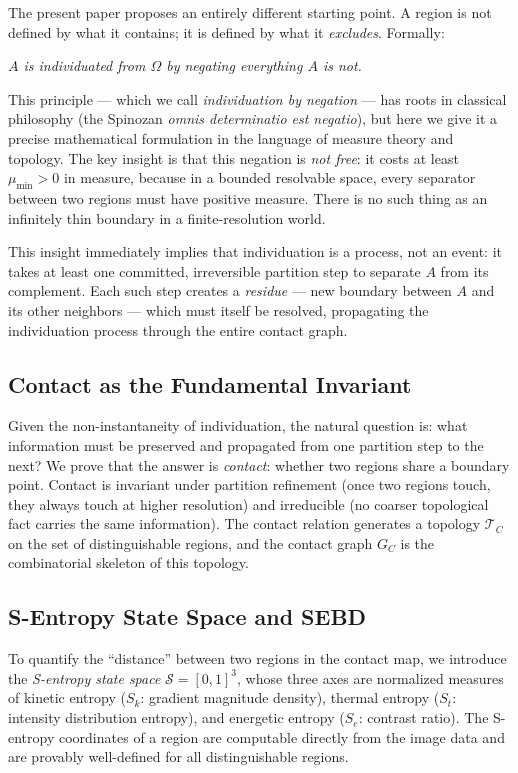 \documentclass[twocolumn]{article}
\theoremstyle{plain}
\theoremstyle{definition}
\newcommand{\TC}{\mathcal{T}_C}
\newcommand{\GC}{G_C}
\newcommand{\ScS}{\mathcal{S}}
\newcommand{\Sk}{S_k}
\newcommand{\St}{S_t}
\newcommand{\Se}{S_e}
\newcommand{\mumin}{\mu_{\min}}
\begin{document}
The present paper proposes an entirely different starting point. A region is not
defined by what it contains; it is defined by what it \emph{excludes}. Formally:

\begin{center}
\emph{$A$ is individuated from $\Omega$ by negating everything $A$ is not.}
\end{center}

This principle --- which we call \emph{individuation by negation} --- has roots
in classical philosophy (the Spinozan \emph{omnis determinatio est negatio}),
but here we give it a precise mathematical formulation in the language of measure
theory and topology. The key insight is that this negation is \emph{not free}: it
costs at least $\mumin > 0$ in measure, because in a bounded resolvable space,
every separator between two regions must have positive measure. There is no
such thing as an infinitely thin boundary in a finite-resolution world.

This insight immediately implies that individuation is a process, not an event:
it takes at least one committed, irreversible partition step to separate $A$ from
its complement. Each such step creates a \emph{residue} --- new boundary between
$A$ and its other neighbors --- which must itself be resolved, propagating the
individuation process through the entire contact graph.

\subsection{Contact as the Fundamental Invariant}

Given the non-instantaneity of individuation, the natural question is: what
information must be preserved and propagated from one partition step to the next?
We prove that the answer is \emph{contact}: whether two regions share a boundary
point. Contact is invariant under partition refinement (once two regions touch,
they always touch at higher resolution) and irreducible (no coarser topological
fact carries the same information). The contact relation generates a topology
$\TC$ on the set of distinguishable regions, and the contact graph $\GC$ is the
combinatorial skeleton of this topology.

\subsection{S-Entropy State Space and SEBD}

To quantify the ``distance'' between two regions in the contact map, we introduce
the \emph{S-entropy state space} $\ScS = [0,1]^3$, whose three axes are
normalized measures of kinetic entropy ($\Sk$: gradient magnitude density),
thermal entropy ($\St$: intensity distribution entropy), and energetic entropy
($\Se$: contrast ratio). The S-entropy coordinates of a region are computable
directly from the image data and are provably well-defined for all distinguishable
regions.
\end{document}

